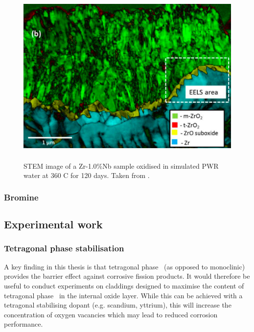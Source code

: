 \begin{figure}[ht] %
    \centering
    \includegraphics[height=9cm]{images/zro_interface.png}
    \caption[STEM image of a Zr-1.0\%Nb sample oxidised in simulated PWR water at 360 C for 120 days.]{STEM image of a Zr-1.0\%Nb sample oxidised in simulated PWR water at 360 C for 120 days. Taken from \cite{inproceedings}.}
    \label{fig:zro_interface}
\end{figure}

\subsubsection{Bromine}

\subsection{Experimental work}

\subsubsection{Tetragonal phase stabilisation}

A key finding in this thesis is that tetragonal phase \zirconia\ (as opposed to monoclinic) provides the barrier effect against corrosive fission products. It would therefore be useful to conduct experiments on claddings designed to maximise the content of tetragonal phase \zirconia\ in the internal oxide layer. While this can be achieved with a tetragonal stabilising dopant (e.g. scandium, yttrium), this will increase the concentration of oxygen vacancies which may lead to reduced corrosion performance. 

